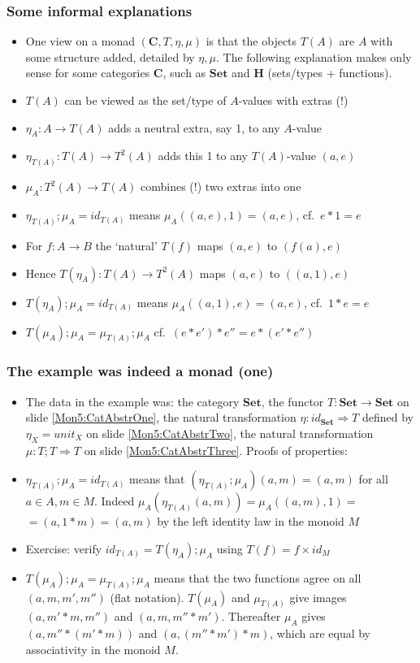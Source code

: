 \documentclass[handout]{beamer}
\newcommand{\To}{\Rightarrow}
\newcommand{\bfsf}[1]{{\boldsymbol{#1}}}
\newcommand{\Set}{\bfsf{Set}}
\newcommand{\CC}{\bfsf{C}}
\newcommand{\HH}{\bfsf{H}}
\begin{document}
\frame
  {   
    \frametitle{Some informal explanations}\label{Mon5:InfoMonad}

 \begin{itemize}[<+->]
\item One view on a monad $(\CC,T,\eta,\mu)$ is that the objects $T(A)$ are $A$
with some structure added, detailed by $\eta,\mu$. The following explanation
makes only sense for some categories $\CC$, such as $\Set$ and $\HH$ 
(sets/types + functions).
\item $T(A)$ can be viewed as the set/type of $A$-values with {\color{red}extras (!)}
\item $\eta_A : A\to T(A)$ adds a neutral extra, say 1, to any $A$-value
\item $\eta_{T(A)} : T(A)\to T^2(A)$ adds this 1 to any $T(A)$-value $(a,e)$
\item $\mu_A: T^2(A)\to T(A)$ {\color{red}combines (!)} two extras into one
\item $\eta_{T(A)};\mu_A = id_{T(A)}$ means $\mu_A((a,e),1) = (a,e)$, cf.\ $e*1=e$
\item For $f:A\to B$ the `natural' $T(f)$ maps $(a,e)$ to $(f(a),e)$
\item Hence $T(\eta_A) : T(A)\to T^2(A)$ maps $(a,e)$ to $((a,1),e)$
\item $T(\eta_A);\mu_A=id_{T(A)}$ means $\mu_A((a,1),e) = (a,e)$, cf.\ $1*e=e$
\item $T(\mu_A);\mu_A = \mu_{T(A)};\mu_A$ cf.\ $(e*e')*e'' = e*(e'*e'')$
 \end{itemize}

 }


\frame
  {   
    \frametitle{The example was indeed a monad (one)}\label{Mon5:ExaMonadOne}

 \begin{itemize}[<+->]
\item The data in the example was: the category $\Set$, 
the functor $T:\Set\to\Set$ on slide \ref{Mon5:CatAbstrOne}, 
the natural transformation $\eta: id_\Set\To T$
defined by $\eta_X = unit_X$ on slide \ref{Mon5:CatAbstrTwo}, 
the natural transformation $\mu: T;T \To T$
on slide \ref{Mon5:CatAbstrThree}. Proofs of properties:
\item $\eta_{T(A)};\mu_A = id_{T(A)}$ means that  $(\eta_{T(A)};\mu_A)(a,m) = (a,m)$
for all $a\in A, m\in M$. Indeed $\mu_A(\eta_{T(A)}(a,m)) = \mu_A((a,m),1) =$ $= (a,1*m) = (a,m)$
by the left identity law in the monoid $M$
\item Exercise: verify  $id_{T(A)} = T(\eta_A);\mu_A$ using $T(f) = f\times id_M$
\item $T(\mu_A);\mu_A = \mu_{T(A)};\mu_A$ means that the two functions agree
on all $(a,m,m',m'')$ (flat notation). $T(\mu_A)$ and $\mu_{T(A)}$ give images $(a,m'*m,m'')$ and $(a,m,m''*m')$. Thereafter $\mu_A$ gives $(a,m''*(m'*m))$ and $(a,(m''*m')*m)$, which are equal by associativity in the monoid $M$.
 \end{itemize}

 }
\end{document}
